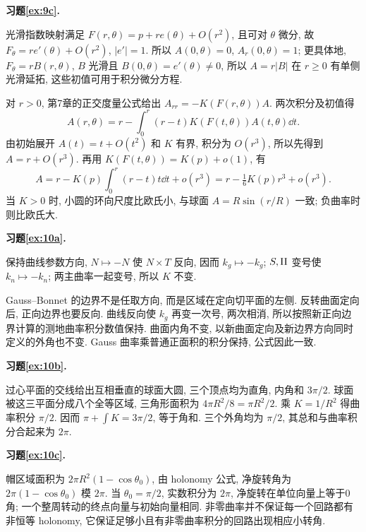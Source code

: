 \par{}
\noindent\textbf{习题\ref{ex:9c}.}
\begin{solution}
光滑指数映射满足 $F(r,\theta)=p+r e(\theta)+O(r^2)$, 且可对 $\theta$ 微分, 故 $F_\theta=r e'(\theta)+O(r^2)$, $|e'|=1$. 所以 $A(0,\theta)=0$, $A_r(0,\theta)=1$; 更具体地, $F_\theta=rB(r,\theta)$, $B$ 光滑且 $B(0,\theta)=e'(\theta)\ne0$, 所以 $A=r|B|$ 在 $r\ge0$ 有单侧光滑延拓, 这些初值可用于积分微分方程.

对 $r>0$, 第7章的正交度量公式给出 $A_{rr}=-K(F(r,\theta))A$. 两次积分及初值得
\[
 A(r,\theta)=r-\int_0^r(r-t)K(F(t,\theta))A(t,\theta)\dd t.
\]
由初始展开 $A(t)=t+O(t^2)$ 和 $K$ 有界, 积分为 $O(r^3)$, 所以先得到 $A=r+O(r^3)$. 再用 $K(F(t,\theta))=K(p)+o(1)$, 有
\[
 A=r-K(p)\int_0^r(r-t)t\dd t+o(r^3)
  =r-\tfrac16K(p)r^3+o(r^3).
\]
当 $K>0$ 时, 小圆的环向尺度比欧氏小, 与球面 $A=R\sin(r/R)$ 一致; 负曲率时则比欧氏大.
\end{solution}
\par{}
\par{}
\noindent\textbf{习题\ref{ex:10a}.}
\begin{solution}
保持曲线参数方向, $N\mapsto-N$ 使 $N\times T$ 反向, 因而 $k_g\mapsto-k_g$; $S,\mathrm{II}$ 变号使 $k_n\mapsto-k_n$; 两主曲率一起变号, 所以 $K$ 不变.

Gauss--Bonnet 的边界不是任取方向, 而是区域在定向切平面的左侧. 反转曲面定向后, 正向边界也要反向. 曲线反向使 $k_g$ 再变一次号, 两次相消, 所以按照新正向边界计算的测地曲率积分数值保持. 曲面内角不变, 以新曲面定向及新边界方向同时定义的外角也不变. Gauss 曲率乘普通正面积的积分保持, 公式因此一致.
\end{solution}
\par{}
\noindent\textbf{习题\ref{ex:10b}.}
\begin{solution}
过心平面的交线给出互相垂直的球面大圆, 三个顶点均为直角, 内角和 $3\pi/2$. 球面被这三平面分成八个全等区域, 三角形面积为 $4\pi R^2/8=\pi R^2/2$. 乘 $K=1/R^2$ 得曲率积分 $\pi/2$. 因而 $\pi+\int K=3\pi/2$, 等于角和. 三个外角均为 $\pi/2$, 其总和与曲率积分合起来为 $2\pi$.
\end{solution}
\par{}
\noindent\textbf{习题\ref{ex:10c}.}
\begin{solution}
帽区域面积为 $2\pi R^2(1-\cos\theta_0)$, 由 holonomy 公式, 净旋转角为 $2\pi(1-\cos\theta_0)$ 模 $2\pi$. 当 $\theta_0=\pi/2$, 实数积分为 $2\pi$, 净旋转在单位向量上等于0角; 一个整周转动的终点向量与初始向量相同. 非零曲率并不保证每一个回路都有非恒等 holonomy, 它保证足够小且有非零曲率积分的回路出现相应小转角.
\end{solution}
